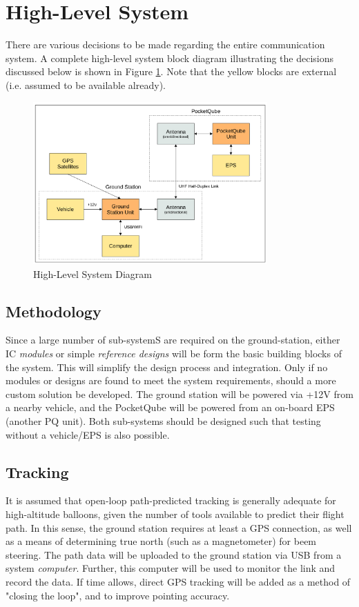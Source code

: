 \graphicspath{{./figures}}

\section{High-Level System}
There are various decisions to be made regarding the entire communication system. A complete high-level system block diagram illustrating the decisions discussed below is shown in Figure \ref{fig:complete_system}. Note that the yellow blocks are external (i.e. assumed to be available already).

\begin{figure}[!htb]
    \centering
    \includegraphics[width=0.8\textwidth]{complete_system.png}
    \caption{High-Level System Diagram}
    \label{fig:complete_system}
  \end{figure}

\newpage
\subsection{Methodology}
Since a large number of sub-systemS are required on the ground-station, either IC \textit{modules} or simple \textit{reference designs} will be form the basic building blocks of the system. This will simplify the design process and integration. Only if no modules or designs are found to meet the system requirements, should a more custom solution be developed. The ground station will be powered via +12V from a nearby vehicle, and the PocketQube will be powered from an on-board EPS (another PQ unit). Both sub-systems should be designed such that testing without a vehicle/EPS is also possible.

\subsection{Tracking}
It is assumed that open-loop path-predicted tracking is generally adequate for high-altitude balloons, given the number of tools available to predict their flight path. In this sense, the ground station requires at least a GPS connection, as well as a means of determining true north (such as a magnetometer) for beem steering. The path data will be uploaded to the ground station via USB from a system \textit{computer}. Further, this computer will be used to monitor the link and record the data. If time allows, direct GPS tracking will be added as a method of "closing the loop", and to improve pointing accuracy.

